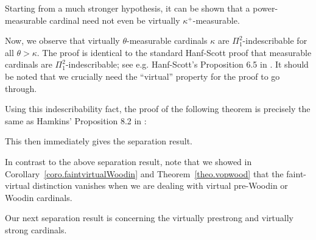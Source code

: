 \documentclass[../../main]{subfiles}
\begin{document}
Starting from a much stronger hypothesis, it can be shown that a power-measurable cardinal need not even be virtually $\kappa^+$-measurable.

\qquad Now, we observe that virtually $\theta$-measurable cardinals $\kappa$ are $\Pi^2_1$-indescribable for all $\theta>\kappa$. The proof is identical to the standard Hanf-Scott proof that measurable cardinals are $\Pi^2_1$-indescribable; see e.g. Hanf-Scott's Proposition 6.5 in \cite{Kanamori}. It should be noted that we crucially need the ``virtual'' property for the proof to go through. 

\qquad Using this indescribability fact, the proof of the following theorem is precisely the same as Hamkins' Proposition 8.2 in \cite{HolySchlicht}:


This then immediately gives the separation result.


In contrast to the above separation result, note that we showed in Corollary~\ref{coro.faintvirtualWoodin} and Theorem~\ref{theo.vopwood} that the faint-virtual distinction vanishes when we are dealing with virtual pre-Woodin or Woodin cardinals.

\qquad Our next separation result is concerning the virtually prestrong and virtually strong cardinals.
\end{document}
